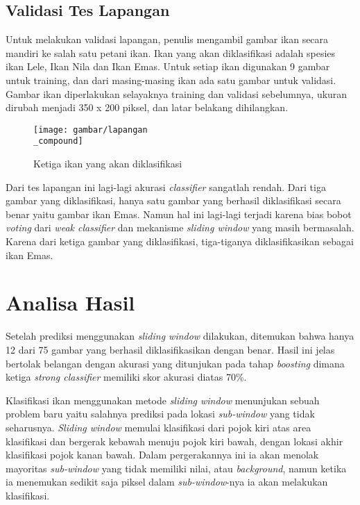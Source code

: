 \subsection{Validasi Tes Lapangan}
		Untuk melakukan validasi lapangan, penulis mengambil gambar ikan secara 
		mandiri ke salah satu petani ikan. Ikan yang akan diklasifikasi adalah spesies 
		ikan Lele, Ikan Nila dan Ikan Emas. Untuk setiap ikan digunakan 9 gambar untuk training, dan 
		dari masing-masing ikan ada satu gambar untuk validasi. Gambar ikan diperlakukan 
		selayaknya training dan validasi sebelumnya, ukuran dirubah menjadi 350 x 200 piksel, 
		dan latar belakang dihilangkan.

		\begin{figure}[H]
			\centering{}
			  \texttt{[image: gambar/lapangan\\\_compound]}
			\caption{Ketiga ikan yang akan diklasifikasi}
		\end{figure}

		Dari tes lapangan ini lagi-lagi akurasi \emph{classifier} 
		sangatlah rendah. Dari tiga gambar yang diklasifikasi, hanya satu 
		gambar yang berhasil diklasifikasi secara benar yaitu gambar ikan Emas. 
		Namun hal ini lagi-lagi terjadi karena bias bobot \textit{voting} dari 
		\emph{weak classifier} dan mekanisme \textit{sliding window} yang masih bermasalah. 
		Karena dari ketiga gambar yang diklasifikasi, tiga-tiganya 
		diklasifikasikan sebagai ikan Emas.

\section{Analisa Hasil}
		Setelah prediksi menggunakan \textit{sliding window} dilakukan, ditemukan bahwa hanya 
		12 dari 75 gambar yang berhasil diklasifikasikan dengan benar. Hasil ini jelas bertolak 
		belangan dengan akurasi yang ditunjukan pada tahap \emph{boosting} dimana ketiga \emph{strong classifier} 
		memiliki skor akurasi diatas 70\%.

		Klasifikasi ikan menggunakan metode \emph{sliding window} menunjukan sebuah problem baru 
		yaitu salahnya prediksi pada lokasi \textit{sub-window} yang tidak seharusnya. \emph{Sliding window} 
		memulai klasifikasi dari pojok kiri atas area klasifikasi dan bergerak kebawah menuju pojok kiri bawah, dengan 
		lokasi akhir klasifikasi pojok kanan bawah. Dalam pergerakannya ini ia akan menolak mayoritas \textit{sub-window} 
		yang tidak memiliki nilai, atau \textit{background}, namun ketika ia menemukan sedikit saja piksel dalam 
		\textit{sub-window}-nya ia akan melakukan klasifikasi. 
		
